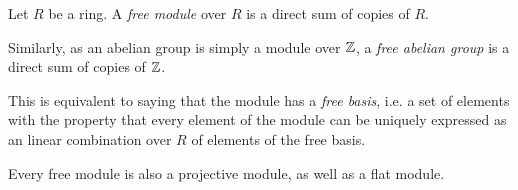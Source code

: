 \documentclass[12pt]{article}
\begin{document}
Let $R$ be a ring.
A {\it free module} over $R$
is a direct sum of copies of $R$.

Similarly, as an abelian group
is simply a module over $\Bbb{Z}$,
a {\it free abelian group}
is a direct sum of copies of $\Bbb{Z}$.

This is equivalent to saying
that the module has a {\it free basis},
i.e. a set of elements
with the property
that every element of the module
can be uniquely expressed
as an linear combination over $R$
of elements of the free basis.

Every free module is also a projective module,
as well as a flat module.
\end{document}
